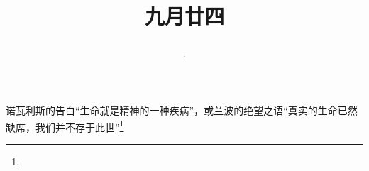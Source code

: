 \title{\date[d=26,m=10,y=2024][year:cn-y,年,month:cn,day:cn,日,·,weekday]·九月廿四 }
诺瓦利斯的告白“生命就是精神的一种疾病”，或兰波的绝望之语“真实的生命已然缺席，我们并不存于此世”\footnote{ }

